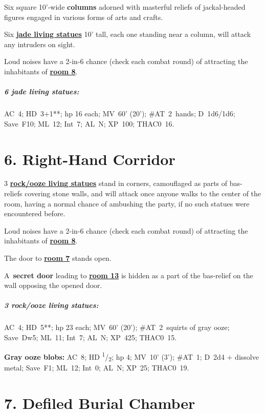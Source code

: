 \documentclass[english,11pt,openany,letterpaper,twocolumn]{book}
\newcommand{\half}{\textsuperscript{1}/\textsubscript{2}}
\begin{document}
\tab Six square 10'-wide \textbf{columns} adorned with masterful reliefs of jackal-headed figures engaged in various forms of arts and crafts.

\tab Six \hyperlink{statue}{\textbf{jade living statues}} 10' tall, each one standing near a column, will attack any intruders on sight.

\tab Loud noises have a 2-in-6 chance (check each combat round) of attracting the inhabitants of \hyperlink{room8}{\textbf{room 8}}.


\begin{textbox}
	\subparagraph{6 jade living statues:} AC~4; HD~3+1**; hp 16 each; MV~60' (20'); \#AT~2~hands; D~1d6/1d6; Save~F10; ML~12; Int~7; AL~N; XP~100; THAC0~16.
\end{textbox}

\enlargethispage{\baselineskip}

\break

\hypertarget{room6}{}
\section{6. Right-Hand Corridor}

3 \hyperlink{statue}{\textbf{rock/ooze living statues}} stand in corners, camouflaged as parts of bas- reliefs covering stone walls, and will attack once anyone walks to the center of the room, having a normal chance of ambushing the party, if no such statues were encountered before.

\tab Loud noises have a 2-in-6 chance (check each combat round) of attracting the inhabitants of \hyperlink{room8}{\textbf{room 8}}.

\tab The door to \hyperlink{room7}{\textbf{room 7}} stands open.

\tab A~\textbf{secret door} leading to \hyperlink{room13}{\textbf{room 13}} is hidden as a part of the bas-relief on the wall opposing the opened door.

\begin{textbox}
	\subparagraph{3 rock/ooze living statues:} AC~4; HD~5**; hp 23 each; MV~60' (20'); \#AT~2~squirts of gray ooze; Save~Dw5; ML~11; Int~7; AL~N; XP~425; THAC0~15.
	
	\textbf{Gray ooze blobs:} AC~8; HD \half; hp 4; MV~10' (3'); \#AT~1; D~2d4 + dissolve metal; Save~F1; ML~12; Int~0; AL~N; XP~25; THAC0~19.
\end{textbox}


\hypertarget{room7}{}
\section{7. Defiled Burial Chamber}
\end{document}
